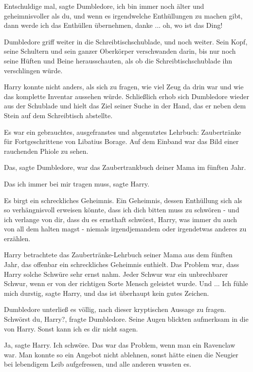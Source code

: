 \glqq{}Entschuldige mal\grqq{}, sagte Dumbledore, \glqq{}ich bin immer noch älter
und geheimnisvoller als du, und wenn es irgendwelche Enthüllungen zu machen
gibt, dann werde ich das Enthüllen übernehmen, danke ... oh, wo ist das
Ding!\grqq{}

Dumbledore griff weiter in die Schreibtischschublade, und noch weiter. Sein
Kopf, seine Schultern und sein ganzer Oberkörper verschwanden darin, bis nur
noch seine Hüften und Beine herausschauten, als ob die Schreibtischschublade ihn
verschlingen würde.

Harry konnte nicht anders, als sich zu fragen, wie viel Zeug da drin war und wie
das komplette Inventar aussehen würde. Schließlich erhob sich Dumbledore wieder
aus der Schublade und hielt das Ziel seiner Suche in der Hand, das er neben dem
Stein auf dem Schreibtisch abstellte.

Es war ein gebrauchtes, ausgefranstes und abgenutztes Lehrbuch: Zaubertränke für
Fortgeschrittene von Libatius Borage. Auf dem Einband war das Bild einer
rauchenden Phiole zu sehen.

\glqq{}Das\grqq{}, sagte Dumbledore, \glqq{}war das Zaubertrankbuch deiner Mama
im fünften Jahr.\grqq{}

\glqq{}Das ich immer bei mir tragen muss\grqq{}, sagte Harry.

\glqq{}Es birgt ein schreckliches Geheimnis. Ein Geheimnis, dessen Enthüllung
sich als so verhängnisvoll erweisen könnte, dass ich dich bitten muss zu
schwören - und ich verlange von dir, dass du es ernsthaft schwörst, Harry, was
immer du auch von all dem halten magst - niemals irgendjemandem oder irgendetwas
anderes zu erzählen.\grqq{}

Harry betrachtete das Zaubertränke-Lehrbuch seiner Mama aus dem fünften Jahr,
das offenbar ein schreckliches Geheimnis enthielt. Das Problem war, dass Harry
solche Schwüre sehr ernst nahm. Jeder Schwur war ein unbrechbarer Schwur, wenn
er von der richtigen Sorte Mensch geleistet wurde. Und ... \glqq{}Ich fühle mich
durstig\grqq{}, sagte Harry, \glqq{}und das ist überhaupt kein gutes
Zeichen.\grqq{}

Dumbledore unterließ es völlig, nach dieser kryptischen Aussage zu fragen. \glqq{}
Schwörst du, Harry?\grqq{}, fragte Dumbledore. Seine Augen blickten aufmerksam
in die von Harry. \glqq{}Sonst kann ich es dir nicht sagen.\grqq{}

\glqq{}Ja\grqq{}, sagte Harry. \glqq{}Ich schwöre.\grqq{} Das war das Problem,
wenn man ein Ravenclaw war. Man konnte so ein Angebot nicht ablehnen, sonst
hätte einen die Neugier bei lebendigem Leib aufgefressen, und alle anderen
wussten es.

